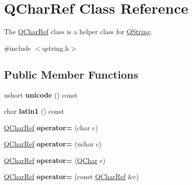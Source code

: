 \hypertarget{class_q_char_ref}{}\section{Q\+Char\+Ref Class Reference}
\label{class_q_char_ref}


The \mbox{\hyperlink{class_q_char_ref}{Q\+Char\+Ref}} class is a helper class for \mbox{\hyperlink{class_q_string}{Q\+String}}.  




{\ttfamily \#include $<$qstring.\+h$>$}

\subsection*{Public Member Functions}
\begin{DoxyCompactItemize}
\item 
\mbox{\label{class_q_char_ref_abeeee94b53fe2e92820251a65ec675fa}} 
ushort {\bfseries unicode} () const
\item 
\mbox{\label{class_q_char_ref_a18f0413eb101e84ee43575c6a95f5ef0}} 
char {\bfseries latin1} () const
\item 
\mbox{\label{class_q_char_ref_a47f21f82ee76a7d5812b49f081fd232f}} 
\mbox{\hyperlink{class_q_char_ref}{Q\+Char\+Ref}} {\bfseries operator=} (char c)
\item 
\mbox{\label{class_q_char_ref_ac65cad91eda1d15edad8de032c847206}} 
\mbox{\hyperlink{class_q_char_ref}{Q\+Char\+Ref}} {\bfseries operator=} (uchar c)
\item 
\mbox{\label{class_q_char_ref_a34c39f6b959d3fada9ecb0a3fff3c635}} 
\mbox{\hyperlink{class_q_char_ref}{Q\+Char\+Ref}} {\bfseries operator=} (\mbox{\hyperlink{class_q_char}{Q\+Char}} c)
\item 
\mbox{\label{class_q_char_ref_a470ab1b2b20425c7d140b78333f9e9d9}} 
\mbox{\hyperlink{class_q_char_ref}{Q\+Char\+Ref}} {\bfseries operator=} (const \mbox{\hyperlink{class_q_char_ref}{Q\+Char\+Ref}} \&c)
\item 
\mbox{\label{class_q_char_ref_ac3caae81799f20bc57f168b01935964f}} 

\end{DoxyCompactItemize}
